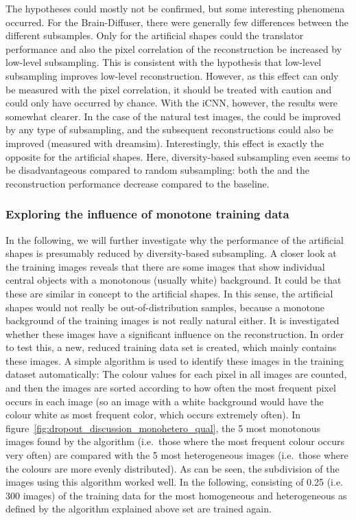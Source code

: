 The hypotheses could mostly not be confirmed, but some interesting phenomena occurred. For the Brain-Diffuser, there were generally few differences between the different subsamples. Only for the artificial shapes could the translator performance and also the pixel correlation of the reconstruction be increased by low-level subsampling. This is consistent with the hypothesis that low-level subsampling improves low-level reconstruction. However, as this effect can only be measured with the pixel correlation, it should be treated with caution and could only have occurred by chance. With the iCNN, however, the results were somewhat clearer. In the case of the natural test images, the  could be improved by any type of subsampling, and the subsequent reconstructions could also be improved (measured with dreamsim). Interestingly, this effect is exactly the opposite for the artificial shapes. Here, diversity-based subsampling even seems to be disadvantageous compared to random subsampling: both the  and the reconstruction performance decrease compared to the baseline. 

\subsubsection{Exploring the influence of monotone training data}
In the following, we will further investigate why the performance of the artificial shapes is presumably reduced by diversity-based subsampling. A closer look at the training images reveals that there are some images that show individual central objects with a monotonous (usually white) background. It could be that these are similar in concept to the artificial shapes. In this sense, the artificial shapes would not really be out-of-distribution samples, because a monotone background of the training images is not really natural either. It is investigated whether these images have a significant influence on the reconstruction. In order to test this, a new, reduced training data set is created, which mainly contains these images. A simple algorithm is used to identify these images in the training dataset automatically: The colour values for each pixel in all images are counted, and then the images are sorted according to how often the most frequent pixel occurs in each image (so an image with a white background would have the colour white as most frequent color, which occurs extremely often). In figure~\ref{fig:dropout_discussion_monohetero_qual}, the 5 most monotonous images found by the algorithm (i.e.\ those where the most frequent colour occurs very often) are compared with the 5 most heterogeneous images (i.e.\ those where the colours are more evenly distributed). As can be seen, the subdivision of the images using this algorithm worked well. In the following,  consisting of 0.25 (i.e. 300 images) of the training data for the most homogeneous and heterogeneous as defined by the algorithm explained above set are trained again.


